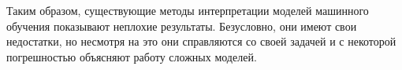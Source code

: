 Таким образом, существующие методы интерпретации моделей машинного обучения показывают неплохие результаты. Безусловно, они имеют свои недостатки, но несмотря на это они справляются со своей задачей и с некоторой погрешностью объясняют работу сложных моделей.